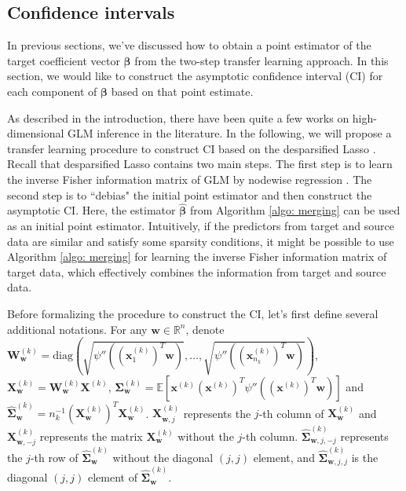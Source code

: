 \documentclass[12pt]{article}
\newcommand{\te}{\mathbb{E}}
\newcommand{\diag}{\text{diag}}
\newcommand{\bbeta}{\bm{\beta}}
\newcommand{\hbeta}{\hat{\bm{\beta}}}
\newcommand{\bxk}[1]{\bm{x}^{(#1)}}
\newcommand{\bXk}[1]{\bm{X}^{(#1)}}
\newcommand{\bw}{\bm{w}}
\newcommand{\bWk}[1]{\bm{W}^{(#1)}}
\newcommand{\<}{\langle}
\renewcommand{\>}{\rangle}
\newcommand{\bSigmak}[1]{\bm{\Sigma}^{(#1)}}
\begin{document}
\subsection{Confidence intervals}\label{subsec:inf}
In previous sections, we've discussed how to obtain a point estimator of the target coefficient vector $\bbeta$ from the two-step transfer learning approach. In this section, we would like to construct the asymptotic confidence interval (CI) for each component of $\bbeta$ based on that point estimate.

As described in the introduction, there have been quite a few works on high-dimensional GLM inference in the literature. In the following, we will propose a transfer learning procedure to construct CI based on the desparsified Lasso \citep{van2014asymptotically}. Recall that desparsified Lasso contains two main steps. The first step is to learn the inverse Fisher information matrix of GLM by nodewise regression \citep{meinshausen2006high}. The second step is to ``debias" the initial point estimator and then construct the asymptotic CI. Here, the estimator $\hbeta$ from Algorithm \ref{algo: merging} can be used as an initial point estimator. Intuitively, if the predictors from target and source data are similar and satisfy some sparsity conditions, it might be possible to use Algorithm \ref{algo: merging} for learning the inverse Fisher information matrix of target data, which effectively combines the information from target and source data.

Before  formalizing the procedure to construct the CI, let's first define several additional notations. For any $\bw \in \mathbb{R}^{n}$, denote $\bWk{k}_{\bw} = \diag\left(\sqrt{\psi''((\bxk{k}_1)^T\bw)}, \ldots, \sqrt{\psi''((\bxk{k}_{n_k})^T\bw)}\right)$, $\bXk{k}_{\bw} = \bWk{k}_{\bw}\bXk{k}$, $\bSigmak{k}_{\bw} = \te[\bxk{k}(\bxk{k})^T\psi''((\bxk{k})^T\bw)]$ and $\widehat{\bm{\Sigma}}^{(k)}_{\bw} = n_k^{-1}(\bXk{k}_{\bw})^T\bXk{k}_{\bw}$. $\bXk{k}_{\bw, j}$ represents the $j$-th column of $\bXk{k}_{\bw}$ and $\bXk{k}_{\bw, -j}$ represents the matrix $\bXk{k}_{\bw}$ without the $j$-th column. $\widehat{\bm{\Sigma}}^{(k)}_{\bw, j, -j}$ represents the $j$-th row of $\widehat{\bm{\Sigma}}^{(k)}_{\bw}$ without the diagonal $(j,j)$ element, and $\widehat{\bm{\Sigma}}^{(k)}_{\bw, j, j}$ is the diagonal $(j,j)$ element of $\widehat{\bm{\Sigma}}^{(k)}_{\bw}$.
\end{document}
